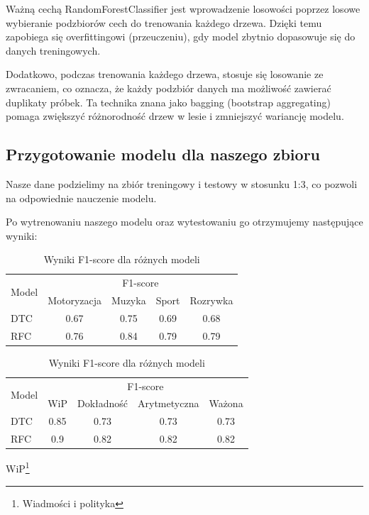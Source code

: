 Ważną cechą RandomForestClassifier jest wprowadzenie losowości poprzez losowe wybieranie podzbiorów cech do trenowania każdego drzewa. Dzięki temu zapobiega się overfittingowi (przeuczeniu), gdy model zbytnio dopasowuje się do danych treningowych.

Dodatkowo, podczas trenowania każdego drzewa, stosuje się losowanie ze zwracaniem, co oznacza, że każdy podzbiór danych ma możliwość zawierać duplikaty próbek. Ta technika znana jako bagging (bootstrap aggregating) pomaga zwiększyć różnorodność drzew w lesie i zmniejszyć wariancję modelu.

\subsection{Przygotowanie modelu dla naszego zbioru}
\hspace{\parindent}

Nasze dane podzielimy na zbiór treningowy i testowy w stosunku 1:3, co pozwoli na odpowiednie nauczenie modelu.

Po wytrenowaniu naszego modelu oraz wytestowaniu go otrzymujemy następujące wyniki:
\begin{table}[htbp]
\centering
\caption{Wyniki F1-score dla różnych modeli}
\label{tab:results}
\begin{tabular}{|l|c|c|c|c|}
\hline
\multirow{2}{*}{Model} & \multicolumn{4}{c|}{F1-score} \\
\cline{2-5}
& Motoryzacja & Muzyka & Sport & Rozrywka \\
\hline
DTC & 0.67 & 0.75 & 0.69 & 0.68 \\
\hline
RFC & 0.76 & 0.84 & 0.79 & 0.79 \\
\hline
\end{tabular}

\vspace{10pt}

\begin{tabular}{|l|c|c|c|c|}
\hline
\multirow{2}{*}{Model} & \multicolumn{4}{c|}{F1-score} \\
\cline{2-5}
& WiP & Dokładność & Arytmetyczna & Ważona \\
\hline
DTC & 0.85 & 0.73 & 0.73 & 0.73 \\
\hline
RFC & 0.9 & 0.82 & 0.82 & 0.82 \\
\hline
\end{tabular}
\end{table}

WiP\footnote{Wiadmości i polityka}


